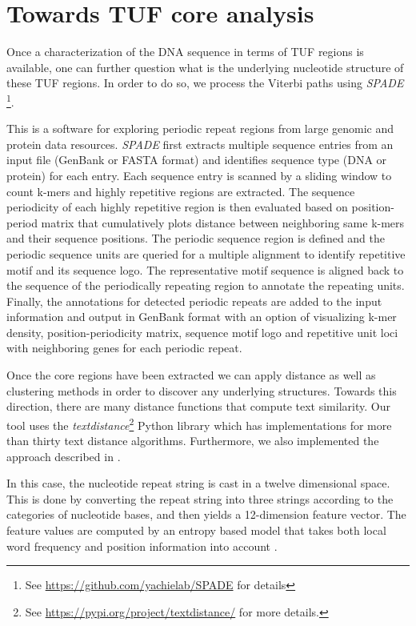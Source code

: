 \documentclass[12pt]{article}
\begin{document}
\section{Towards TUF core analysis}
\label{tuf_core_analysis}
Once a characterization of the DNA sequence in terms of TUF regions is available, one can further question what is the underlying nucleotide structure of these TUF regions. In order to do so, we process the Viterbi paths using \emph{SPADE} \footnote{See \url{https://github.com/yachielab/SPADE} for details}.


This is a software for exploring periodic repeat regions from large genomic and protein data resources. \emph{SPADE} first extracts multiple sequence entries from an input file (GenBank or FASTA format) and identifies sequence type (DNA or protein) for each entry. Each sequence entry is scanned by a sliding window to count k-mers and highly repetitive regions are extracted. The sequence periodicity of each highly repetitive region is then evaluated based on position-period matrix that cumulatively plots distance between neighboring same k-mers and their sequence positions. The periodic sequence region is defined and the periodic sequence units are queried for a multiple alignment to identify repetitive motif and its sequence logo. The representative motif sequence is aligned back to the sequence of the periodically repeating region to annotate the repeating units. Finally, the annotations for detected periodic repeats are added to the input information and output in GenBank format with an option of visualizing k-mer density, position-periodicity matrix, sequence motif logo and repetitive unit loci with neighboring genes for each periodic repeat.

Once the core regions have been extracted we can apply distance as well as clustering methods in order to discover any underlying structures. Towards this direction, there are many distance functions that compute text similarity. Our tool uses the \emph{textdistance}\footnote{See \url{https://pypi.org/project/textdistance/} for more details. } Python library which has implementations for more than thirty text distance algorithms. Furthermore, we also implemented the approach described in \cite{2014Bao}. 

In this case, the nucleotide repeat string is cast in a twelve dimensional space. This is done by converting the repeat string into three strings according to the categories of nucleotide bases, and then yields a 12-dimension feature vector. The feature values are computed by an entropy based model that takes both local word frequency and position information into account \cite{2014Bao}. 
\end{document}
